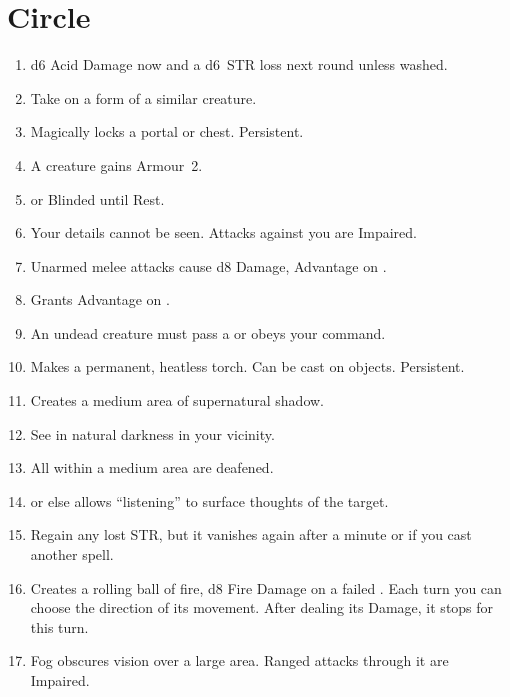 \documentclass[itdr]{subfiles}
\begin{document}

\vfill
\break

\section{ Circle}
\def \spellcircle {2}
\begin{enumerate}
	\item {} d6 Acid Damage now and a d6~STR loss next round unless washed.
	\item {} Take on a form of a similar creature.
	\item {} Magically locks a portal or chest. Persistent.
	\item {} A creature gains Armour~2.
	\item {}  or Blinded until Rest.
	\item {} Your details cannot be seen. Attacks against you are Impaired.
	\item {} Unarmed melee attacks cause d8 Damage, Advantage on .
	\item {} Grants Advantage on .
	\item {} An undead creature must pass a  or obeys your command.
	\item {} Makes a permanent, heatless torch. Can be cast on objects. Persistent.
	\item {} Creates a medium area of supernatural shadow.
	\item {} See in natural darkness in your vicinity.
	\item {} All within a medium area are deafened.
	\item {}  or else allows \mbox{``listening''} to surface thoughts of the target.
	\item {} Regain any lost STR, but it vanishes again after a minute or if you cast another spell.
	\item {} Creates a rolling ball of fire, d8 Fire Damage on a failed . Each turn you can choose the direction of its movement. After dealing its Damage, it stops for this turn.
	\item {} Fog obscures vision over a large area. Ranged attacks through it are Impaired.

\end{enumerate}
\end{document}
